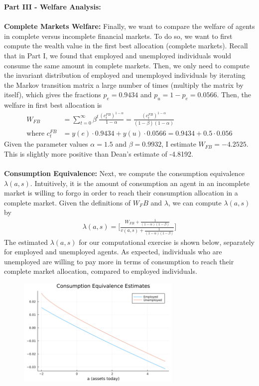 \documentclass[12pt]{article}
\begin{document}
\clearpage
\noindent \textbf{Part III - Welfare Analysis: } \\\\
\textbf{Complete Markets Welfare: }Finally, we want to compare the welfare of agents in complete versus incomplete financial markets. To do so, we want to first compute the wealth value in the first best allocation (complete markets). Recall that in Part I, we found that employed and unemployed individuals would consume the same amount in complete markets. Then, we only need to compute the invariant distribution of employed and unemployed individuals by iterating the Markov transition matrix a large number of times (multiply the matrix by itself), which gives the fractions $p_e = 0.9434$ and $p_u = 1 - p_e = 0.0566$. Then, the welfare in first best allocation is 
\begin{align*}
    W_{FB} &= \sum_{t=0}^{\infty} \beta^t \frac{(c_t^{FB})^{1-\alpha}}{1-\alpha} = \frac{(c_t^{FB})^{1-\alpha}}{(1-\beta)(1-\alpha)} \\
    \text{where } c_t^{FB} &= y(e) \cdot 0.9434 + y(u) \cdot 0.0566 = 0.9434 + 0.5 \cdot 0.056
\end{align*}
Given the parameter values $\alpha = 1.5$ and $\beta = 0.9932$, I estimate $W_{FB} = -4.2525$. This is slightly more positive than Dean's estimate of -4.8192. \\\\
\textbf{Consumption Equivalence: }Next, we compute the consumption equivalence $\lambda(a, s)$. Intuitively, it is the amount of consumption an agent in an incomplete market is willing to forgo in order to reach their consumption allocation in a complete market. Given the definitions of $W_FB$ and $\lambda$, we can compute $\lambda(a, s)$ by 
\begin{align*}
    \lambda(a, s) = \Bigg[\frac{W_{FB} + \frac{1}{(1-\alpha)(1-\beta)}}{v(a, s) + \frac{1}{(1-\alpha)(1-\beta)}} \Bigg]
\end{align*}
The estimated $\lambda(a, s)$ for our computational exercise is shown below, separately for employed and unemployed agents. As expected, individuals who are unemployed are willing to pay more in terms of consumption to reach their complete market allocation, compared to employed individuals.
\begin{figure}[!htbp]
    \centering
    \includegraphics[width = 0.7\textwidth]{Lambda.png}
    \label{fig:lambda}
\end{figure}
\end{document}
